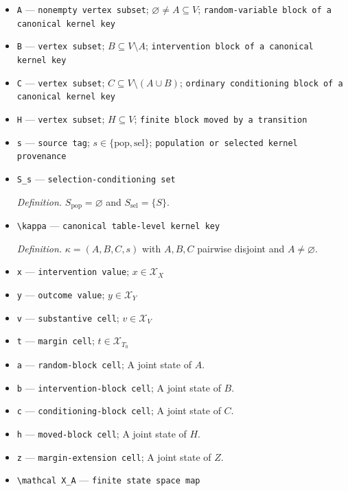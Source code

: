 \documentclass{article}
\begin{document}
\begin{itemize}
  \item \texttt{A} --- \texttt{nonempty vertex subset}; \(\varnothing\ne A\subseteq V\); \texttt{random-\allowbreak{}variable block of a canonical kernel key}
  \item \texttt{B} --- \texttt{vertex subset}; \(B\subseteq V\setminus A\); \texttt{intervention block of a canonical kernel key}
  \item \texttt{C} --- \texttt{vertex subset}; \(C\subseteq V\setminus(A\cup B)\); \texttt{ordinary conditioning block of a canonical kernel key}
  \item \texttt{H} --- \texttt{vertex subset}; \(H\subseteq V\); \texttt{finite block moved by a transition}
  \item \texttt{s} --- \texttt{source tag}; \(s\in\{\mathrm{pop},\mathrm{sel}\}\); \texttt{population or selected kernel provenance}
  \item \texttt{S\_\allowbreak{}s} --- \texttt{selection-\allowbreak{}conditioning set}
  \par\smallskip\noindent\emph{Definition.} \(S_{\mathrm{pop}}=\varnothing\) and \(S_{\mathrm{sel}}=\{S\}\).
  \item \texttt{\textbackslash{}\allowbreak{}kappa} --- \texttt{canonical table-\allowbreak{}level kernel key}
  \par\smallskip\noindent\emph{Definition.} \(\kappa=(A,B,C,s)\) with \(A,B,C\) pairwise disjoint and \(A\ne\varnothing\).
  \item \texttt{x} --- \texttt{intervention value}; \(x\in\mathcal X_X\)
  \item \texttt{y} --- \texttt{outcome value}; \(y\in\mathcal X_Y\)
  \item \texttt{v} --- \texttt{substantive cell}; \(v\in\mathcal X_V\)
  \item \texttt{t} --- \texttt{margin cell}; \(t\in\mathcal X_{T_0}\)
  \item \texttt{a} --- \texttt{random-\allowbreak{}block cell}; A joint state of \(A\).
  \item \texttt{b} --- \texttt{intervention-\allowbreak{}block cell}; A joint state of \(B\).
  \item \texttt{c} --- \texttt{conditioning-\allowbreak{}block cell}; A joint state of \(C\).
  \item \texttt{h} --- \texttt{moved-\allowbreak{}block cell}; A joint state of \(H\).
  \item \texttt{z} --- \texttt{margin-\allowbreak{}extension cell}; A joint state of \(Z\).
  \item \texttt{\textbackslash{}\allowbreak{}mathcal X\_\allowbreak{}A} --- \texttt{finite state space map}

\end{itemize}
\end{document}

